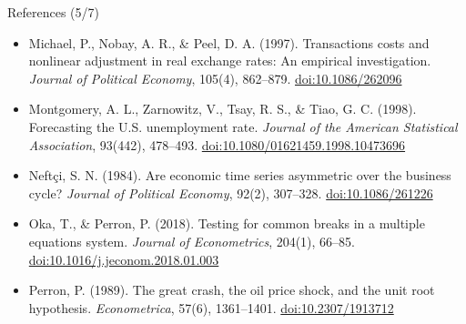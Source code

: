 \begin{frame}{References (5/7)}
\begin{itemize}
    \item Michael, P., Nobay, A. R., \& Peel, D. A. (1997). Transactions costs and nonlinear adjustment in real exchange rates: An empirical investigation. \textit{Journal of Political Economy}, 105(4), 862--879. \href{https://doi.org/10.1086/262096}{doi:10.1086/262096}
    \item Montgomery, A. L., Zarnowitz, V., Tsay, R. S., \& Tiao, G. C. (1998). Forecasting the U.S. unemployment rate. \textit{Journal of the American Statistical Association}, 93(442), 478--493. \href{https://doi.org/10.1080/01621459.1998.10473696}{doi:10.1080/01621459.1998.10473696}
    \item Neftçi, S. N. (1984). Are economic time series asymmetric over the business cycle? \textit{Journal of Political Economy}, 92(2), 307--328. \href{https://doi.org/10.1086/261226}{doi:10.1086/261226}
    \item Oka, T., \& Perron, P. (2018). Testing for common breaks in a multiple equations system. \textit{Journal of Econometrics}, 204(1), 66--85. \href{https://doi.org/10.1016/j.jeconom.2018.01.003}{doi:10.1016/j.jeconom.2018.01.003}
    \item Perron, P. (1989). The great crash, the oil price shock, and the unit root hypothesis. \textit{Econometrica}, 57(6), 1361--1401. \href{https://doi.org/10.2307/1913712}{doi:10.2307/1913712}
\end{itemize}
\end{frame}

